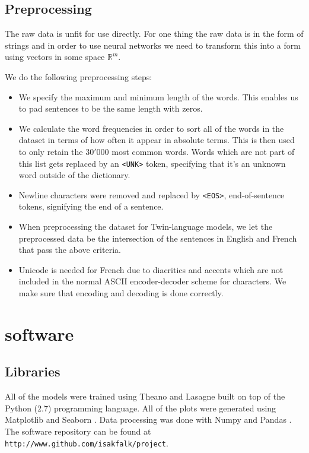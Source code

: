 \subsection{Preprocessing}

The raw data is unfit for use directly. For one thing the raw
data is in the form of strings and in order to use neural networks we need to
transform this into a form using vectors in some space $\mathbb{R}^m$.

We do the following preprocessing steps:

\begin{itemize}
\item We specify the maximum and minimum length of the words. This enables us to
  pad sentences to be the same length with zeros.
\item We calculate the word frequencies in order to sort all of the words in the
  dataset in terms of how often it appear in absolute terms. This is then used
  to only retain the $30'000$ most common words. Words which are not part of this
  list gets replaced by an \texttt{<UNK>} token, specifying that it's an unknown
  word outside of the dictionary.
\item Newline characters were removed and replaced by \texttt{<EOS>},
  end-of-sentence tokens, signifying the end of a sentence.
\item When preprocessing the dataset for Twin-language models, we let the
  preprocessed data be the intersection of the sentences in English and French
  that pass the above criteria.
\item Unicode is needed for French due to diacritics and accents which are not
  included in the normal ASCII encoder-decoder scheme for characters. We make
  sure that encoding and decoding is done correctly.
\end{itemize}

\section{software}

\subsection{Libraries}
All of the models were trained using Theano \cite{2016arXiv160502688short} and Lasagne \cite{lasagne} built on
top of the Python (2.7) programming language. All of the plots were
generated using Matplotlib \cite{Hunter:2007} and Seaborn \cite{michael_waskom_2014_12710}. Data processing was done with Numpy
\cite{Walt:2011:NAS:1957373.1957466} and Pandas \cite{mckinney-proc-scipy-2010}. The software repository can be found at \texttt{http://www.github.com/isakfalk/project}.

